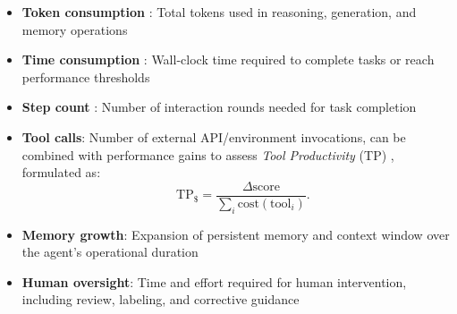 \documentclass[10pt]{article} %
\begin{document}
\begin{itemize}

    \item \textbf{Token consumption} \citep{hu2024treeplannerefficientcloselooptask}: Total tokens used in reasoning, generation, and memory operations

    \item \textbf{Time consumption} \citep{lu2024axis}: Wall-clock time required to complete tasks or reach performance thresholds

    \item \textbf{Step count} \citep{wang2023voyager}: Number of interaction rounds needed for task completion

    \item \textbf{Tool calls}: Number of external API/environment invocations, can be combined with performance gains to assess \emph{Tool Productivity} (TP) \citep{wang2025otcpo}, formulated as:
\[\quad 
\mathrm{TP}_{\$}=\frac{\Delta \text{score}}{\sum_i \text{cost}(\text{tool}_i)}.
\]
    \item \textbf{Memory growth}: Expansion of persistent memory and context window over the agent's operational duration

    \item \textbf{Human oversight}: Time and effort required for human intervention, including review, labeling, and corrective guidance

\end{itemize}
\end{document}
